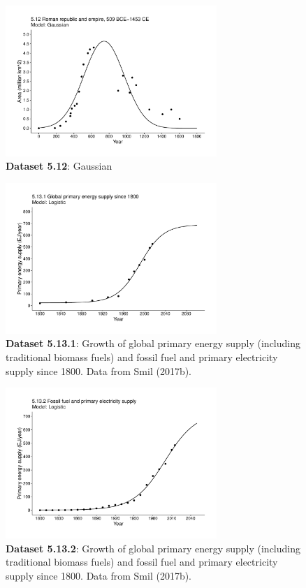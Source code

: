 \documentclass[aps,rmp,preprint,superscriptaddress,10pt,onecolumn]{article}
\begin{document}
\begin{figure}[h]
\includegraphics[width=8cm]{output/figs-ggplot/5.12.pdf}
\caption{\textbf{Dataset 5.12}: Gaussian}
\end{figure}
	
\begin{figure}[h]
\includegraphics[width=8cm]{output/figs-ggplot/5.13.1.pdf}
\caption{\textbf{Dataset 5.13.1}: Growth of global primary energy supply (including traditional biomass fuels) and fossil fuel and primary electricity supply since 1800. Data from Smil (2017b). }
\end{figure}
	
\begin{figure}[h]
\includegraphics[width=8cm]{output/figs-ggplot/5.13.2.pdf}
\caption{\textbf{Dataset 5.13.2}: Growth of global primary energy supply (including traditional biomass fuels) and fossil fuel and primary electricity supply since 1800. Data from Smil (2017b). }
\end{figure}
	
\end{document}

